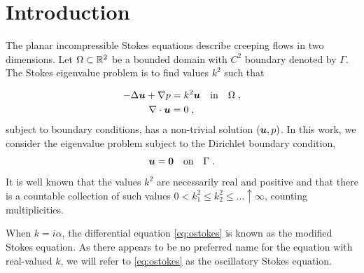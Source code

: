 \section{Introduction}

The planar incompressible Stokes equations describe
creeping flows in two dimensions.
%
Let $\Omega \subset \mathbb{R}^2$
be a bounded domain with $C^2$ boundary denoted by $\Gamma$.
%
The Stokes eigenvalue problem is to find
values $k^2$ such that 

\begin{equation}
\begin{aligned}
  -\Delta {\boldsymbol u} + \nabla p &= k^2 {\boldsymbol u} \quad \textrm{in} \quad
  \Omega \label{eq:ostokes} \; , \\
  \nabla \cdot {\boldsymbol u} &= 0 \; ,
\end{aligned}
\end{equation}
subject to boundary conditions, has a non-trivial solution $({\boldsymbol u},p)$.
%
In this work, we consider the eigenvalue problem subject to 
the Dirichlet boundary condition,
\begin{equation}
  {\boldsymbol u} = {\boldsymbol 0} \quad \textrm{on} \quad \Gamma \label{eq:ostokes_dir} \; .
\end{equation}
It is well known that the values $k^2$ are necessarily
real and positive and that there is a countable collection of such
values $0 < k_{1}^{2} \leq k_{2}^2 \leq \ldots \uparrow \infty$,
counting multiplicities.

\begin{remark}
  When $k = i\alpha$, the differential equation
  \cref{eq:ostokes} is known as the modified Stokes
  equation. As there appears to be no preferred
  name for the equation with real-valued $k$,
  we will refer to \cref{eq:ostokes} as the
  oscillatory Stokes equation.
\end{remark}

